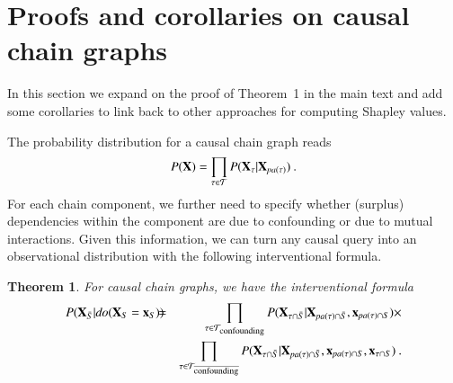\documentclass{article}
\newcommand{\vX}{\mathbf{X}}
\newcommand{\vx}{\mathbf{x}}
\newcommand{\dodo}{\mathit{do}}
\newcommand{\lvdo}[1]{\dodo(\vX_{#1} = \vx_{#1})}
\newcommand{\spa}{\mathop{\textit{\scriptsize pa}}}
\newcommand{\isequal}{\hspace*{-2.5mm} & = & \hspace*{-2.5mm}}
\newcommand{\chaincomponents}{{\cal T}}
\newtheorem{theorem}{Theorem}
\begin{document}
\section{Proofs and corollaries on causal chain graphs}

In this section we expand on the proof of Theorem~1 in the main text and add some corollaries to link back to other approaches for computing Shapley values.

The probability distribution for a causal chain graph reads
\begin{equation}
P(\vX) = \prod_{\tau \in \chaincomponents} P(\vX_\tau|\vX_{\spa(\tau)}) \: .
\label{eq:chaingraph}
\end{equation}
For each chain component, we further need to specify whether  (surplus) dependencies within the component are due to confounding or due to mutual interactions. Given this information, we can turn any causal query into an observational distribution with the following interventional formula.

\begin{theorem}
	For causal chain graphs, we have the interventional formula 
	\begin{eqnarray}
	P(\vX_{\bar{S}}|\lvdo{S}) \isequal \prod_{\tau \in \chaincomponents_{\textrm{\upshape \scriptsize confounding}}} P(\vX_{\tau \cap \bar{S}}|\vX_{\spa(\tau)  \cap \bar{S}},\vx_{\spa(\tau) \cap S}) \times \nonumber \\
	&& \prod_{\tau \in \chaincomponents_{\overline{\textrm{\upshape \scriptsize confounding}}}} P(\vX_{\tau \cap \bar{S}}|\vX_{\spa(\tau) \cap \bar{S}},\vx_{\spa(\tau) \cap S},\vx_{\tau \cap S}) \: .
	\label{eq:chaininterventional}
	\end{eqnarray}
\end{theorem}
\end{document}
